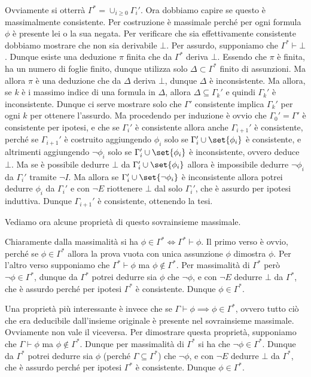 Ovviamente si otterrà \(\Gamma^* = \cup_{i\geq 0} \Gamma_i'\). Ora dobbiamo capire se questo è massimalmente consistente. Per costruzione è massimale perché per ogni formula \(\phi\) è presente lei o la sua negata. Per verificare che sia effettivamente consistente dobbiamo mostrare che non sia derivabile \(\bot\). Per assurdo, supponiamo che \(\Gamma^* \vdash \bot\). Dunque esiste una deduzione \(\pi\) finita che da \(\Gamma^*\) deriva \(\bot\). Essendo che \(\pi\) è finita, ha un numero di foglie finito, dunque utilizza solo \(\Delta\subset \Gamma^*\) finito di assunzioni. Ma allora \(\pi\) è una deduzione che da \(\Delta\) deriva \(\bot\), dunque \(\Delta\) è inconsistente. Ma allora, se \(k\) è i massimo indice di una formula in \(\Delta\), allora \(\Delta \subseteq \Gamma_k'\) e quindi \(\Gamma_k'\) è inconsistente. Dunque ci serve mostrare solo che \(\Gamma'\) consistente implica \(\Gamma_k'\) per ogni \(k\) per ottenere l'assurdo. Ma procedendo per induzione è ovvio che \(\Gamma_0' = \Gamma'\) è consistente per ipotesi, e che se \(\Gamma_i'\) è consistente allora anche \(\Gamma_{i+1}'\) è consistente, perché se \(\Gamma_{i+1}'\) è costruito aggiungendo \(\phi_i\) solo se \(\Gamma_i' \cup \set{\phi_i}\) è consistente, e altrimenti aggiungendo \(\neg \phi_i\) solo se \(\Gamma_i' \cup \set{\phi_i}\) è inconsistente, ovvero deduce \(\bot\). Ma se è possibile dedurre \(\bot\) da \(\Gamma_i' \cup \set{\phi_i}\) allora è impossibile dedurre \(\neg \phi_i\) da \(\Gamma_i' \) tramite \(\neg I\). Ma allora se \(\Gamma_i'\cup \set{\neg \phi_i}\) è inconsistente allora potrei dedurre \(\phi_i\) da \(\Gamma_i'\) e con \(\neg E\) riottenere \(\bot\) dal solo \(\Gamma_i'\), che è assurdo per ipotesi induttiva. Dunque \(\Gamma_{i+1}'\) è consistente, ottenendo la tesi.

Vediamo ora alcune proprietà di questo sovrainsieme massimale.

Chiaramente dalla massimalità si ha \(\phi \in \Gamma^* \iff \Gamma^* \vdash \phi\). Il primo verso è ovvio, perché se \(\phi \in \Gamma^*\) allora la prova vuota con unica assunzione \(\phi\) dimostra \(\phi\). Per l'altro verso supponiamo che \(\Gamma^* \vdash \phi\) ma \(\phi \notin \Gamma^*\). Per massimalità di \(\Gamma^*\) però \(\neg \phi \in \Gamma^*\), dunque da \(\Gamma^*\) potrei dedurre sia \(\phi\) che \(\neg \phi\), e con \(\neg E\) dedurre \(\bot\) da \(\Gamma^*\), che è assurdo perché per ipotesi \(\Gamma^*\) è consistente. Dunque \(\phi \in \Gamma^*\).

Una proprietà più interessante è invece che se \(\Gamma \vdash \phi \implies \phi \in \Gamma^*\), ovvero tutto ciò che era deducibile dall'insieme originale è presente nel sovrainsieme massimale. Ovviamente non vale il viceversa. Per dimostrare questa proprietà, supponiamo che \(\Gamma \vdash \phi\) ma \(\phi \notin \Gamma^*\). Dunque per massimalità di \(\Gamma^*\) si ha che \(\neg \phi \in \Gamma^*\). Dunque da \(\Gamma^*\) potrei dedurre sia \(\phi\) (perché \(\Gamma \subseteq \Gamma^*\)) che \(\neg \phi\), e con \(\neg E\) dedurre \(\bot\) da \(\Gamma^*\), che è assurdo perché per ipotesi \(\Gamma^*\) è consistente. Dunque \(\phi \in \Gamma^*\).

